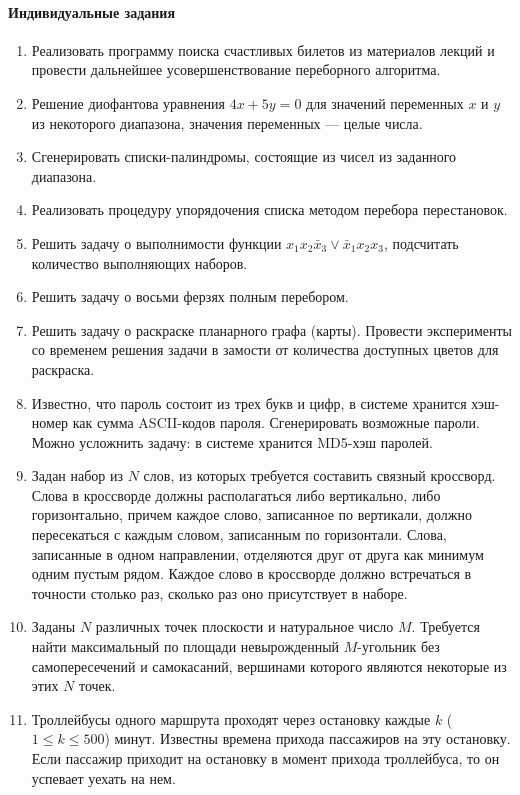 \documentclass[12pt, openany, twoside]{book} %
\begin{document}
\paragraph{Индивидуальные задания}
\begin{enumerate}
\item Реализовать программу поиска счастливых билетов из материалов лекций и провести дальнейшее усовершенствование переборного алгоритма.
\item Решение диофантова уравнения $4x+5y=0$ для значений переменных $x$ и $y$ из некоторого диапазона, значения переменных --- целые числа.
\item Сгенерировать списки-палиндромы, состоящие из чисел из заданного диапазона.
\item Реализовать процедуру упорядочения списка методом перебора перестановок.
\item Решить задачу о выполнимости функции $x_1x_2\bar{x}_3\vee \bar{x}_1x_2x_3$, подсчитать количество выполняющих наборов.
\item Решить задачу о восьми ферзях полным перебором.
\item Решить задачу о раскраске планарного графа (карты). Провести эксперименты со временем решения задачи в замости от количества доступных цветов для раскраска.
\item Известно, что пароль состоит из трех букв и цифр, в системе хранится хэш-номер как сумма ASCII-кодов пароля. Сгенерировать возможные пароли. Можно усложнить задачу: в системе хранится MD5-хэш паролей.
\item Задан набор из $N$ слов, из которых требуется составить связный кроссворд. Слова в кроссворде должны располагаться либо вертикально, либо горизонтально, причем каждое слово, записанное по вертикали, должно пересекаться с каждым словом, записанным по горизонтали. Слова, записанные в одном направлении, отделяются друг от друга как минимум одним пустым рядом. Каждое слово в кроссворде должно встречаться в точности столько раз, сколько раз оно присутствует в наборе.
\item Заданы $N$ различных точек плоскости и натуральное число $M$. Требуется найти максимальный по площади невырожденный $M$-угольник без самопересечений и самокасаний, вершинами которого являются некоторые из этих $N$ точек.
\item Троллейбусы одного маршрута проходят через остановку
каждые $k$ ($1\leq{}k\leq{}500$) минут. Известны времена прихода пассажиров
на эту остановку. Если пассажир приходит на остановку в
момент прихода троллейбуса, то он успевает уехать на нем.


\end{enumerate}
\end{document}
